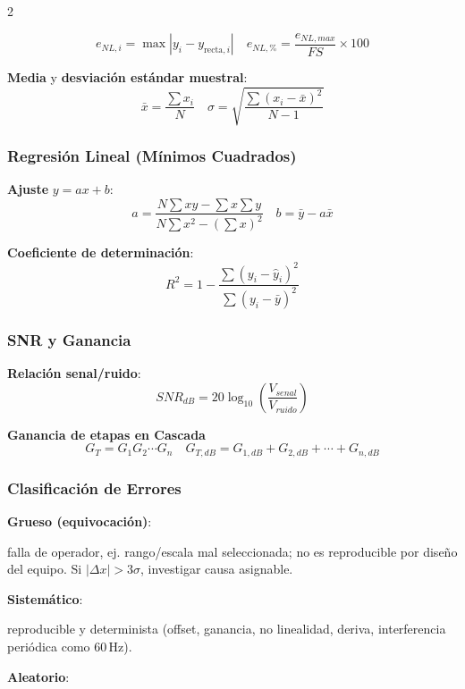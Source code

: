 \documentclass{article}
\begin{document}
\begin{multicols}{2}
\begin{itemform}
$$
e_{NL,i}=\max|y_i-y_{\text{recta},i}|
\quad
e_{NL,\%}=\frac{e_{NL,max}}{FS}\times100
$$
\end{itemform}




\begin{itemform}
\item \textbf{Media} y \textbf{desviación estándar muestral}:
$$\bar{x}=\frac{\sum x_i}{N} \quad \sigma=\sqrt{\frac{\sum(x_i-\bar{x})^2}{N-1}}$$
\end{itemform}

\subsubsection*{Regresión Lineal (Mínimos Cuadrados)}
\begin{itemform}
\item \textbf{Ajuste} $y=ax+b$:
$$a=\frac{N\sum xy-\sum x\sum y}{N\sum x^2-(\sum x)^2} \quad b=\bar{y}-a\bar{x}$$
\item \textbf{Coeficiente de determinación}:
$$R^2=1-\frac{\sum(y_i-\hat{y}_i)^2}{\sum(y_i-\bar{y})^2}$$
\end{itemform}


\subsubsection*{SNR y Ganancia}
\begin{itemform}
\item \textbf{Relación senal/ruido}:
$$SNR_{dB}=20\log_{10}\left(\frac{V_{senal}}{V_{ruido}}\right)$$
\item \textbf{Ganancia de etapas en Cascada}
$$
G_T = G_1G_2\cdots G_n \quad G_{T,dB}=G_{1,dB}+G_{2,dB}+\cdots+G_{n,dB}$$
\end{itemform}

\subsubsection*{Clasificación de Errores}
\begin{itemform}
\item \textbf{Grueso (equivocación)}: 

falla de operador, ej. rango/escala mal seleccionada; no es reproducible por diseño del equipo.
Si $|\Delta x|>3 \sigma$, investigar causa asignable.

\item \textbf{Sistemático}:

reproducible y determinista (offset, ganancia, no linealidad, deriva, interferencia periódica como 60\,Hz).
\item \textbf{Aleatorio}:


\end{itemform}
\end{multicols}
\end{document}
